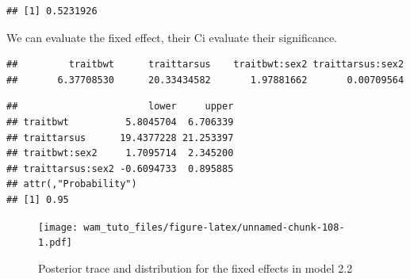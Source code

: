 \documentclass[
  12pt,
]{book}
\newenvironment{Shaded}{\begin{snugshade}}{\end{snugshade}}
\newcommand{\DecValTok}[1]{\textcolor[rgb]{0.00,0.00,0.81}{#1}}
\newcommand{\FloatTok}[1]{\textcolor[rgb]{0.00,0.00,0.81}{#1}}
\newcommand{\KeywordTok}[1]{\textcolor[rgb]{0.13,0.29,0.53}{\textbf{#1}}}
\newcommand{\NormalTok}[1]{#1}
\newcommand{\OperatorTok}[1]{\textcolor[rgb]{0.81,0.36,0.00}{\textbf{#1}}}
\newcommand{\StringTok}[1]{\textcolor[rgb]{0.31,0.60,0.02}{#1}}
\begin{document}
\begin{Shaded}
\end{Shaded}

\begin{verbatim}
## [1] 0.5231926
\end{verbatim}

We can evaluate the fixed effect, their Ci evaluate their significance.

\begin{Shaded}
\end{Shaded}

\begin{verbatim}
##         traitbwt      traittarsus    traitbwt:sex2 traittarsus:sex2 
##       6.37708530      20.33434582       1.97881662       0.00709564
\end{verbatim}

\begin{Shaded}
\end{Shaded}

\begin{verbatim}
##                       lower     upper
## traitbwt          5.8045704  6.706339
## traittarsus      19.4377228 21.253397
## traitbwt:sex2     1.7095714  2.345200
## traittarsus:sex2 -0.6094733  0.895885
## attr(,"Probability")
## [1] 0.95
\end{verbatim}

\begin{Shaded}
\end{Shaded}

\begin{figure}
\centering
\texttt{[image: wam\_tuto\_files/figure-latex/unnamed-chunk-108-1.pdf]}
\caption{\label{fig:unnamed-chunk-108}Posterior trace and distribution for the fixed effects in model 2.2}
\end{figure}
\end{document}
